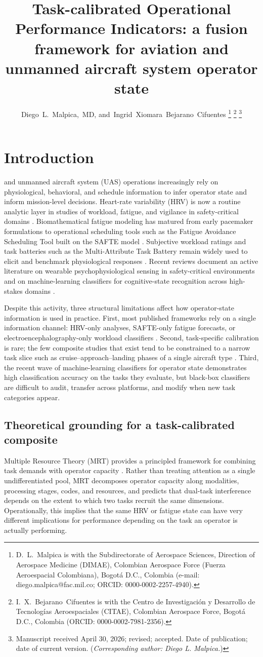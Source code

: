 \documentclass[10pt,journal,twocolumn,compsoc]{IEEEtran}
\title{Task-calibrated Operational Performance Indicators: a fusion framework for aviation and unmanned aircraft system operator state}
\author{Diego~L.~Malpica,~MD,
        and~Ingrid~Xiomara~Bejarano~Cifuentes
\thanks{D.~L.~Malpica is with the Subdirectorate of Aerospace Sciences, Direction of Aerospace Medicine (DIMAE), Colombian Aerospace Force (Fuerza Aeroespacial Colombiana), Bogot\'a D.C., Colombia (e-mail: diego.malpica@fac.mil.co; ORCID: 0000-0002-2257-4940).}
\thanks{I.~X.~Bejarano~Cifuentes is with the Centro de Investigaci\'on y Desarrollo de Tecnolog\'ias Aeroespaciales (CITAE), Colombian Aerospace Force, Bogot\'a D.C., Colombia (ORCID: 0000-0002-7981-2356).}
\thanks{Manuscript received April 30, 2026; revised; accepted. Date of publication; date of current version. (\textit{Corresponding author: Diego L. Malpica.})}}
\begin{document}
\maketitle
\IEEEdisplaynontitleabstractindextext
\IEEEpeerreviewmaketitle

\section{Introduction}
 and unmanned aircraft system (UAS) operations increasingly rely on physiological, behavioral, and schedule information to infer operator state and inform mission-level decisions. Heart-rate variability (HRV) is now a routine analytic layer in studies of workload, fatigue, and vigilance in safety-critical domains \cite{shaffer2017,quigley2024}. Biomathematical fatigue modeling has matured from early pacemaker formulations to operational scheduling tools such as the Fatigue Avoidance Scheduling Tool built on the SAFTE model \cite{forger1999,hursh2004,devine2022}. Subjective workload ratings and task batteries such as the Multi-Attribute Task Battery remain widely used to elicit and benchmark physiological responses \cite{pontiggia2024}. Recent reviews document an active literature on wearable psychophysiological sensing in safety-critical environments \cite{houghton2024} and on machine-learning classifiers for cognitive-state recognition across high-stakes domains \cite{jin2025}.

Despite this activity, three structural limitations affect how operator-state information is used in practice. First, most published frameworks rely on a single information channel: HRV-only analyses, SAFTE-only fatigue forecasts, or electroencephalography-only workload classifiers \cite{hamann2026}. Second, task-specific calibration is rare; the few composite studies that exist tend to be constrained to a narrow task slice such as cruise--approach--landing phases of a single aircraft type \cite{feng2018}. Third, the recent wave of machine-learning classifiers for operator state \cite{stevens2022,vogl2025,li2025} demonstrates high classification accuracy on the tasks they evaluate, but black-box classifiers are difficult to audit, transfer across platforms, and modify when new task categories appear.

\subsection{Theoretical grounding for a task-calibrated composite}
Multiple Resource Theory (MRT) provides a principled framework for combining task demands with operator capacity \cite{wickens2002,wickens2008}. Rather than treating attention as a single undifferentiated pool, MRT decomposes operator capacity along modalities, processing stages, codes, and resources, and predicts that dual-task interference depends on the extent to which two tasks recruit the same dimensions. Operationally, this implies that the same HRV or fatigue state can have very different implications for performance depending on the task an operator is actually performing.
\end{document}
